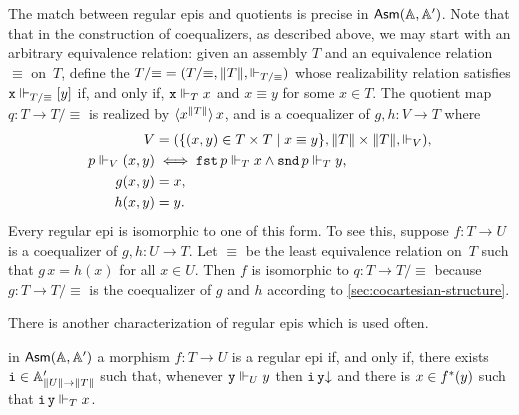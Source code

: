 The match between regular epis and quotients is precise in $\AsmA$.
Note that that in the construction of coequalizers, as described
above, we may start with an arbitrary equivalence relation: given an
assembly $T$ and an equivalence relation $\equiv$ on~$T$, define
the  $T/{\equiv} = (T/{\equiv}, \T{T},
\rz[T/{\equiv}])$ whose realizability relation satisfies $\R{x}
\rz[T/{\equiv}] [y]$ if, and only if, $\R{x} \rz[T] x$ and $x \equiv
y$ for some $x \in T$. The quotient map $q : T \to T/{\equiv}$ is
realized by $\tpcalam{x}{\T{T}} x$, and is a coequalizer of $g,
h : V \to T$ where
%
\begin{align*}
  V &= (\set{(x,y) \in T \times T \such x \equiv y},
             \T{T} \times \T{T}, {\rz[V]}),\\
  p \rz[V] (x,y) &\iff
  \combFst\,p \rz[T] x \land \combSnd\,p \rz[T] y, \\
  g (x, y) &= x,\\
  h (x, y) &= y.
\end{align*}
%
Every regular epi is isomorphic to one of this form. To see this,
suppose $f : T \to U$ is a coequalizer of $g, h : U
\to T$. Let $\equiv$ be the least equivalence relation on~$T$
such that $g\,x = h(x)$ for all $x \in U$. Then $f$ is isomorphic to
$q : T \to T/{\equiv}$ because $g : T \to
T/{\equiv}$ is the coequalizer of $g$ and $h$ according to
\cref{sec:cocartesian-structure}.

There is another characterization of regular epis which is used often.

\begin{proposition}
  \label{prop:reg-epi-when}%
  in $\AsmA$ a morphism $f : T \to U$ is a regular epi
  if, and only if, there exists $\R{i} \in \subAtyp{\T{U} \to \T{T}}$
  such that, whenever $\R{y} \rz[U] y$ then $\defined{\R{i}\,\R{y}}$
  and there is $x \in \invim{f}(y)$ such that $\R{i}\,\R{y} \rz[T] x$.
\end{proposition}


